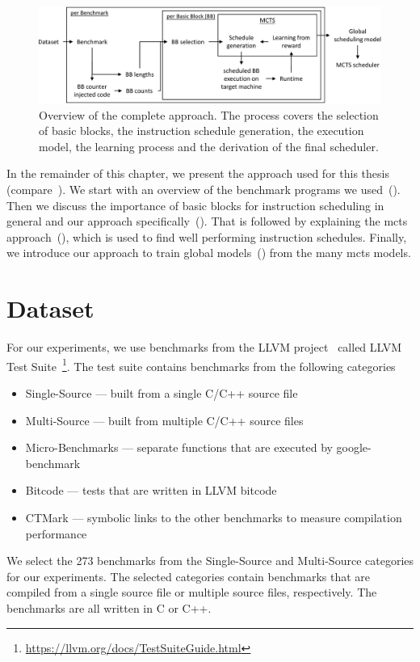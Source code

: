 \begin{figure}
    \centering
    \includegraphics[width=\textwidth]{img/ppt/approach_overview-crop.pdf}
    \caption[Overview of the approach]{Overview of the complete approach. 
    The process covers the selection of basic blocks, the instruction schedule generation, the execution model, the learning process and the derivation of the final scheduler.}
    \label{fig:approach:overview}
\end{figure}
In the remainder of this chapter, we present the approach used for this thesis (compare~).
We start with an overview of the benchmark programs we used~().
Then we discuss the importance of basic blocks for instruction scheduling in general and our approach specifically~().
That is followed by explaining the \ac{mcts} approach~(), which is used to find well performing instruction schedules.
Finally, we introduce our approach to train global models~() from the many \ac{mcts} models.

\section{Dataset}
\label{sec:approach:dataset}
For our experiments, we use benchmarks from the LLVM project~\cite{LLVM:CGO04} called LLVM Test Suite~\footnote{\url{https://llvm.org/docs/TestSuiteGuide.html}}.
The test suite contains benchmarks from the following categories
\begin{itemize}
    \item Single-Source --- built from a single C/C++ source file
    \item Multi-Source --- built from multiple C/C++ source files
    \item Micro-Benchmarks --- separate functions that are executed by google-benchmark
    \item Bitcode --- tests that are written in LLVM bitcode
    \item CTMark --- symbolic links to the other benchmarks to measure compilation performance
\end{itemize}
We select the 273 benchmarks from the Single-Source and Multi-Source categories for our experiments.
The selected categories contain benchmarks that are compiled from a single source file or multiple source files, respectively.
The benchmarks are all written in C or C++.

